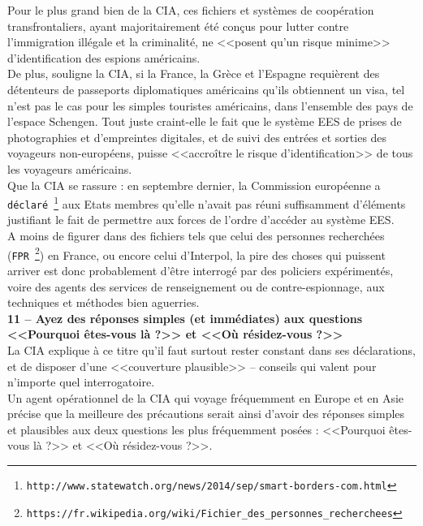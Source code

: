 \documentclass[11pt,twoside,a4paper]{article}
\begin{document}
Pour le plus grand bien de la CIA, ces fichiers et syst{\`e}mes de coop{\'e}ration transfrontaliers, ayant majoritairement {\'e}t{\'e} con\c{c}us pour lutter contre l'immigration ill{\'e}gale et la criminalit{\'e}, ne <<posent qu'un risque minime>> d'identification des espions am{\'e}ricains. ~\\

De plus, souligne la CIA, si la France, la Gr{\`e}ce et l'Espagne requi{\`e}rent des d{\'e}tenteurs de passeports diplomatiques am{\'e}ricains qu'ils obtiennent un visa, tel n'est pas le cas pour les simples touristes am{\'e}ricains, dans l'ensemble des pays de l'espace Schengen. Tout juste craint-elle le fait que le syst{\`e}me EES de prises de photographies et d'empreintes digitales, et de suivi des entr{\'e}es et sorties des voyageurs non-europ{\'e}ens, puisse <<accro{\^i}tre le risque d'identification>> de tous les voyageurs am{\'e}ricains. ~\\

Que la CIA se rassure : en septembre dernier, la Commission europ{\'e}enne a \texttt{d{\'e}clar{\'e}}~\footnote{\texttt{http://www.statewatch.org/news/2014/sep/smart-borders-com.html}} aux Etats membres qu'elle n'avait pas r{\'e}uni suffisamment d'{\'e}l{\'e}ments justifiant le fait de permettre aux forces de l'ordre d'acc{\'e}der au syst{\`e}me EES. ~\\

A moins de figurer dans des fichiers tels que celui des personnes recherch{\'e}es (\texttt{FPR}~\footnote{\texttt{https://fr.wikipedia.org/wiki/Fichier\_des\_personnes\_recherchees}}) en France, ou encore celui d'Interpol, la pire des choses qui puissent arriver est donc probablement d'{\^e}tre interrog{\'e} par des policiers exp{\'e}riment{\'e}s, voire des agents des services de renseignement ou de contre-espionnage, aux techniques et m{\'e}thodes bien aguerries. ~\\

\textbf{\large 11 -- Ayez des r{\'e}ponses simples (et imm{\'e}diates) aux questions <<Pourquoi {\^e}tes-vous l{\`a} ?>> et <<O{\`u} r{\'e}sidez-vous ?>>}~\\

La CIA explique {\`a} ce titre qu'il faut surtout rester constant dans ses d{\'e}clarations, et de disposer d'une <<couverture plausible>> -- conseils qui valent pour n'importe quel interrogatoire. ~\\

Un agent op{\'e}rationnel de la CIA qui voyage fr{\'e}quemment en Europe et en Asie pr{\'e}cise que la meilleure des pr{\'e}cautions serait ainsi d'avoir des r{\'e}ponses simples et plausibles aux deux questions les plus fr{\'e}quemment pos{\'e}es : <<Pourquoi {\^e}tes-vous l{\`a} ?>> et <<O{\`u} r{\'e}sidez-vous ?>>. ~\\
\end{document}
